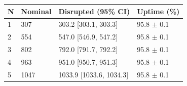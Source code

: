 \begin{tabular}{p{0.7cm}p{1.5cm}p{2.3cm}p{1.9cm}}
\toprule
\textbf{N} & \textbf{Nominal} & \textbf{Disrupted (95\% CI)} & \textbf{Uptime (\%)} \\
\midrule
1 & 307 & 303.2 [303.1, 303.3] & 95.8 $\pm$ 0.1 \\
2 & 554 & 547.0 [546.9, 547.2] & 95.8 $\pm$ 0.1 \\
3 & 802 & 792.0 [791.7, 792.2] & 95.8 $\pm$ 0.1 \\
4 & 963 & 951.0 [950.7, 951.3] & 95.8 $\pm$ 0.1 \\
5 & 1047 & 1033.9 [1033.6, 1034.3] & 95.8 $\pm$ 0.1 \\
\bottomrule
\end{tabular}